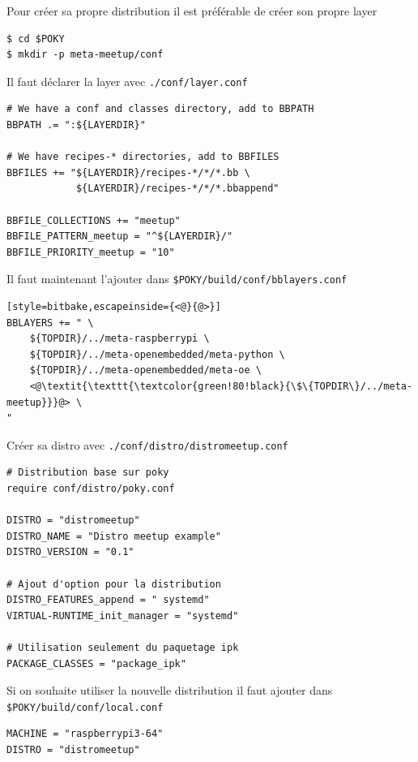 \documentclass[compress]{smilebeamer}
\begin{document}
\begin{frame}[fragile]
Pour créer sa propre distribution il est préférable de créer son propre layer
\begin{lstlisting}[style=shell]
$ cd $POKY
$ mkdir -p meta-meetup/conf
\end{lstlisting}

Il faut déclarer la layer avec \texttt{./conf/layer.conf}
\begin{lstlisting}[style=bitbake]
# We have a conf and classes directory, add to BBPATH
BBPATH .= ":${LAYERDIR}"

# We have recipes-* directories, add to BBFILES
BBFILES += "${LAYERDIR}/recipes-*/*/*.bb \
            ${LAYERDIR}/recipes-*/*/*.bbappend"

BBFILE_COLLECTIONS += "meetup"
BBFILE_PATTERN_meetup = "^${LAYERDIR}/"
BBFILE_PRIORITY_meetup = "10"
\end{lstlisting}
\end{frame}

\begin{frame}[fragile]
Il faut maintenant l'ajouter dans \texttt{\$POKY/build/conf/bblayers.conf}
\begin{lstlisting}[style=bitbake,escapeinside={<@}{@>}]
BBLAYERS += " \
    ${TOPDIR}/../meta-raspberrypi \
    ${TOPDIR}/../meta-openembedded/meta-python \
    ${TOPDIR}/../meta-openembedded/meta-oe \
    <@\textit{\texttt{\textcolor{green!80!black}{\$\{TOPDIR\}/../meta-meetup}}}@> \
"
\end{lstlisting}
\end{frame}

\begin{frame}[fragile]
Créer sa distro avec \texttt{./conf/distro/distromeetup.conf}
\begin{lstlisting}[style=bitbake]
# Distribution base sur poky
require conf/distro/poky.conf

DISTRO = "distromeetup"
DISTRO_NAME = "Distro meetup example"
DISTRO_VERSION = "0.1"

# Ajout d'option pour la distribution
DISTRO_FEATURES_append = " systemd"
VIRTUAL-RUNTIME_init_manager = "systemd"

# Utilisation seulement du paquetage ipk
PACKAGE_CLASSES = "package_ipk"
\end{lstlisting}

Si on souhaite utiliser la nouvelle distribution il faut ajouter dans \texttt{\$POKY/build/conf/local.conf}
\begin{lstlisting}[style=bitbake]
MACHINE = "raspberrypi3-64"
DISTRO = "distromeetup"
\end{lstlisting}
\end{frame}
\end{document}
